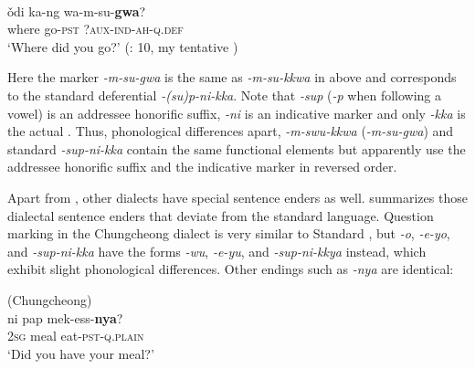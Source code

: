 \ea%
    \label{ex:kore:16}
    \\
    \gll ǒdi  ka-ng    wa-m-su-\textbf{{gwa}}?\\
    where  go-\textsc{pst}    ?\textsc{aux}-\textsc{ind}-\textsc{ah}-\textsc{q}.\textsc{def}\\
    \glt ‘Where did you go?’ (\citealt{Kiaer2014}: 10, my tentative )
    \z

Here the marker \textit{-m-su-gwa} is the same as \textit{-m-su-kkwa} in  above and corresponds to the standard  deferential  \textit{-(su)p-ni-kka}. Note that \textit{-sup} (\textit{-p} when following a vowel) is an addressee honorific suffix, \textit{-ni} is an indicative marker and only \textit{-kka} is the actual  \citep[341]{Sohn1994}. Thus, phonological differences apart,  \textit{-m-swu-kkwa} (\textit{-m-su-gwa}) and standard  \textit{-sup-ni-kka} contain the same functional elements but apparently use the addressee honorific suffix and the indicative marker in reversed order.

Apart from , other dialects have special sentence enders as well.  summarizes those dialectal  sentence enders that deviate from the standard language. Question marking in the Chungcheong dialect is very similar to Standard , but \textit{-o}, \textit{-e-yo}, and \textit{-sup-ni-kka} have the forms \textit{-wu}, \textit{-e-yu}, and \textit{-sup-ni-kkya} instead, which exhibit slight phonological differences. Other endings such as \textit{-nya} are identical:

\ea%
    \label{ex:kore:17}
     (Chungcheong)\\
    \gll ni  pap  mek-ess-\textbf{{nya}}?\\
    2\textsc{sg}  meal  eat-\textsc{pst}-\textsc{q}.\textsc{plain}\\
    \glt ‘Did you have your meal?’ \citep[71]{Sohn1999}
    \z

